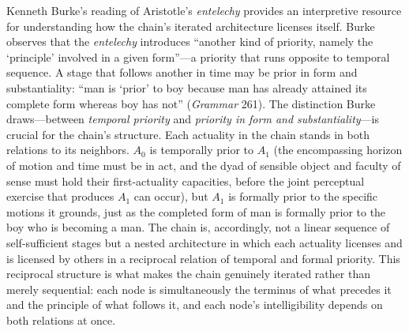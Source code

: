Kenneth Burke's reading of Aristotle's \textit{entelechy} provides an interpretive resource for understanding how the chain's iterated architecture licenses itself. Burke observes that the \textit{entelechy} introduces ``another kind of priority, namely the `principle' involved in a given form''---a priority that runs opposite to temporal sequence. A stage that follows another in time may be prior in form and substantiality: ``man is `prior' to boy because man has already attained its complete form whereas boy has not'' (\textit{Grammar} 261). The distinction Burke draws---between \textit{temporal priority} and \textit{priority in form and substantiality}---is crucial for the chain's structure. Each actuality in the chain stands in both relations to its neighbors. $A_0$ is temporally prior to $A_1$ (the encompassing horizon of motion and time must be in act, and the dyad of sensible object and faculty of sense must hold their first-actuality capacities, before the joint perceptual exercise that produces $A_1$ can occur), but $A_1$ is formally prior to the specific motions it grounds, just as the completed form of man is formally prior to the boy who is becoming a man. The chain is, accordingly, not a linear sequence of self-sufficient stages but a nested architecture in which each actuality licenses and is licensed by others in a reciprocal relation of temporal and formal priority. This reciprocal structure is what makes the chain genuinely iterated rather than merely sequential: each node is simultaneously the terminus of what precedes it and the principle of what follows it, and each node's intelligibility depends on both relations at once.

